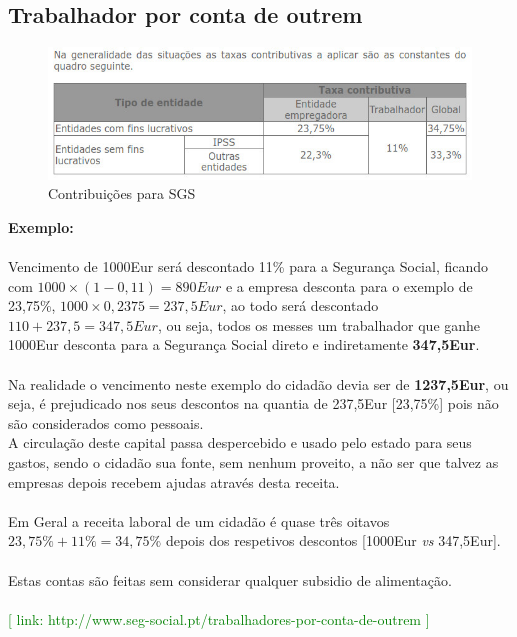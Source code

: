 \subsection{Trabalhador por conta de outrem}
\begin{figure}[H]
\flushleft
\includegraphics[scale=.5]{./image/SGS/Contribuicoes_1.jpg}
\caption{Contribuições para SGS}
\end{figure}\par
\textbf{Exemplo:} \\
\\
Vencimento de 1000Eur será descontado 11\% para a Segurança Social, ficando com $1000\times (1-0,11)=890Eur$ e a empresa desconta para o exemplo de 23,75\%, $1000\times 0,2375=237,5Eur$, ao todo será descontado $110+237,5=347,5Eur$, ou seja, todos os messes um trabalhador que ganhe 1000Eur desconta para a Segurança Social direto e indiretamente \textbf{347,5Eur}. \\ \\
Na realidade o vencimento neste exemplo do cidadão devia ser de \textbf{1237,5Eur}, ou seja, é prejudicado nos seus descontos na quantia de 237,5Eur [23,75\%] pois não são considerados como pessoais. \\
A circulação deste capital passa despercebido e usado pelo estado para seus gastos, sendo o cidadão sua fonte, sem nenhum proveito, a não ser que talvez as empresas depois recebem ajudas através desta receita. \\ \\
Em Geral a receita laboral de um cidadão é quase três oitavos $23,75\%+11\%=34,75\%$ depois dos respetivos descontos [1000Eur \textit{vs} 347,5Eur]. \\
\\
Estas contas são feitas sem considerar qualquer subsidio de alimentação. \\
\\
\textcolor{green}{\small [ link: \quad http://www.seg-social.pt/trabalhadores-por-conta-de-outrem ]}

